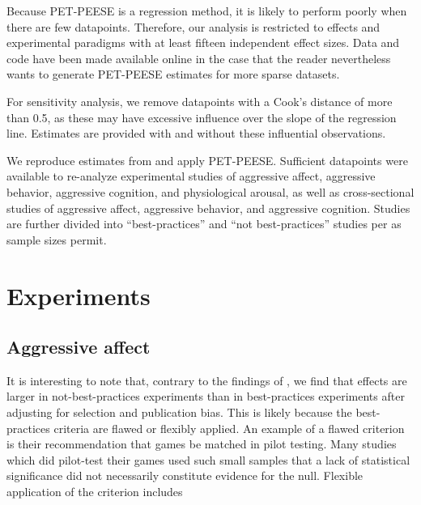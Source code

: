Because PET-PEESE is a regression method, it is likely to perform poorly when there are few datapoints. Therefore, our analysis is restricted to effects and experimental paradigms with at least fifteen %
independent effect sizes. Data and code have been made available online in the case that the reader nevertheless wants to generate PET-PEESE estimates for more sparse datasets.

For sensitivity analysis, we remove datapoints with a Cook's distance of more than 0.5, as these may have excessive influence over the slope of the regression line. Estimates are provided with and without these influential observations.

We reproduce estimates from \citet{Anderson:etal:2010} and apply PET-PEESE. Sufficient datapoints were available to re-analyze experimental studies of aggressive affect, aggressive behavior, aggressive cognition, and physiological arousal, as well as cross-sectional studies of aggressive affect, aggressive behavior, and aggressive cognition. Studies are further divided into ``best-practices'' and ``not best-practices'' studies per \citet{Anderson:etal:2010} as sample sizes permit.


\section{Experiments}
\subsection{Aggressive affect}

It is interesting to note that, contrary to the findings of \citet{Anderson:etal:2010}, we find that effects are larger in not-best-practices experiments than in best-practices experiments after adjusting for selection and publication bias. This is likely because the best-practices criteria are flawed or flexibly applied. An example of a flawed criterion is their recommendation that games be matched in pilot testing. Many studies which did pilot-test their games used such small samples that a lack of statistical significance did not necessarily constitute evidence for the null. %
Flexible application of the criterion includes %


